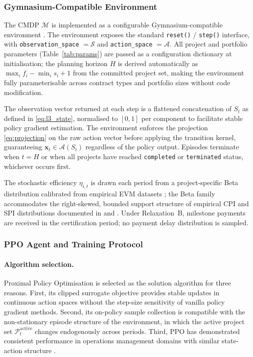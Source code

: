 \subsubsection{Gymnasium-Compatible Environment}
\label{subsubsec:l3_env}

The CMDP $\mathcal{M}$ is implemented as a configurable
Gymnasium-compatible environment \citep{Towers2024}. The environment
exposes the standard \texttt{reset()} / \texttt{step()} interface,
with \texttt{observation\_space} $= \mathcal{S}$ and
\texttt{action\_space} $= \mathcal{A}$. All project and portfolio
parameters (Table~\ref{tab:params}) are passed as a configuration
dictionary at initialisation; the planning horizon $H$ is derived
automatically as $\max_i f_i - \min_i s_i + 1$ from the committed
project set, making the environment fully parameterisable across
contract types and portfolio sizes without code modification.

The observation vector returned at each step is a flattened
concatenation of $S_t$ as defined in \eqref{eq:l3_state}, normalised
to $[0,1]$ per component to facilitate stable policy gradient
estimation. The environment enforces the projection \eqref{eq:projection}
on the raw action vector before applying the transition kernel,
guaranteeing $\mathbf{x}_t \in \mathcal{A}(S_t)$ regardless of the
policy output. Episodes terminate when $t = H$ or when all projects
have reached \texttt{completed} or \texttt{terminated} status,
whichever occurs first.

The stochastic efficiency $\eta_{i,t}$ is drawn each period from a
project-specific Beta distribution calibrated from empirical EVM
datasets \citep{Acebes2015, Batselier2017}; the Beta family
accommodates the right-skewed, bounded support structure of empirical
CPI and SPI distributions documented in \citet{Lipke2003} and
\citet{Batselier2017}. Under Relaxation~B, milestone payments are
received in the certification period; no payment delay distribution
is sampled.

\subsubsection{PPO Agent and Training Protocol}
\label{subsubsec:l3_ppo}

\paragraph{Algorithm selection.}
Proximal Policy Optimisation \citep{Schulman2017} is selected as the
solution algorithm for three reasons. First, its clipped surrogate
objective provides stable updates in continuous action spaces without
the step-size sensitivity of vanilla policy gradient methods. Second,
its on-policy sample collection is compatible with the non-stationary
episode structure of the environment, in which the active project set
$\mathcal{P}_t^{\mathrm{active}}$ changes endogenously across
periods. Third, PPO has demonstrated consistent performance in
operations management domains with similar state-action structure
\citep{Giannoccaro2002, Peng2021}.

